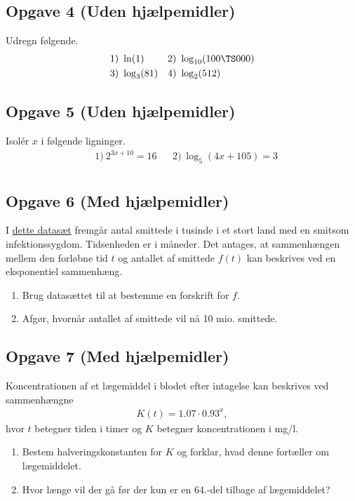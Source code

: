 \subsection*{Opgave 4 (Uden hjælpemidler)}

Udregn følgende.
\begin{align*}
	&1) \   \ln(1)  &  &2) \ \log_{10}(100\TS 000)\\
	&3) \ \log_3(81)  &  &4) \ \log_{2}(512) 
\end{align*}

\subsection*{Opgave 5 (Uden hjælpemidler)}

Isolér $x$ i følgende ligninger.
\begin{align*}
	&1) \ 2^{3x + 10} = 16 &&2) \ \log_5(4x + 105) = 3 \\
\end{align*}
\subsection*{Opgave 6 (Med hjælpemidler)}

I \href{https://github.com/ChristianJLex/TeachingNotes/raw/master/2024-2025/Data og lign/Smittetal.xlsx}{\color{blue!60} dette datasæt} fremgår antal smittede i tusinde i et stort land med en smitsom infektionssygdom. Tidsenheden er i måneder. 
Det antages, at sammenhængen mellem den forløbne tid $t$ og antallet af smittede $f(t)$ kan beskrives ved en eksponentiel sammenhæng. 
\begin{enumerate}[label=\roman*)]
	\item Brug datasættet til at bestemme en forskrift for $f$. 
	\item Afgør, hvornår antallet af smittede vil nå 10 mio. smittede.
\end{enumerate} 

\subsection*{Opgave 7 (Med hjælpemidler)}
Koncentrationen af et lægemiddel i blodet efter intagelse kan beskrives ved sammenhængne
\begin{align*}
	K(t) = 1.07\cdot 0.93^x,
\end{align*}
hvor $t$ betegner tiden i timer og $K$ betegner koncentrationen i mg/l.
\begin{enumerate}[label=\roman*)]
	\item Bestem halveringskonstanten for $K$ og forklar, hvad denne fortæller om lægemiddelet.
	\item Hvor længe vil der gå før der kun er en 64.-del tilbage af lægemiddelet?
\end{enumerate}
\newpage
